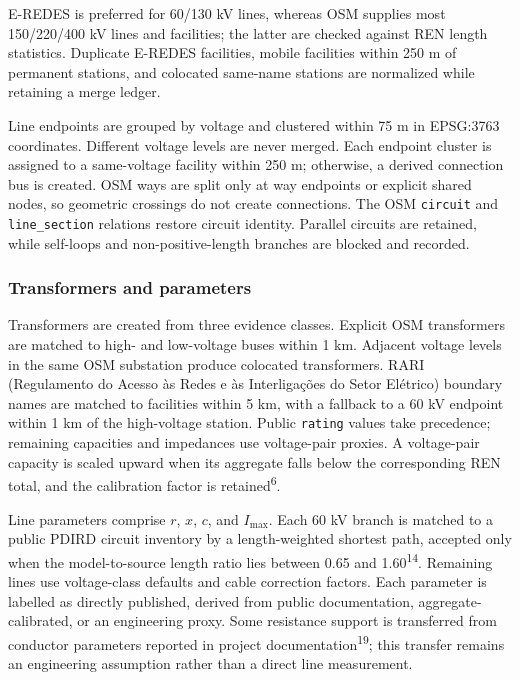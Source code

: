 \documentclass[
  10pt]{article}
\begin{document}
E-REDES is preferred for 60/130 kV lines, whereas OSM supplies most
150/220/400 kV lines and facilities; the latter are checked against REN
length statistics. Duplicate E-REDES facilities, mobile facilities
within 250 m of permanent stations, and colocated same-name stations are
normalized while retaining a merge ledger.

Line endpoints are grouped by voltage and clustered within 75 m in
EPSG:3763 coordinates. Different voltage levels are never merged. Each
endpoint cluster is assigned to a same-voltage facility within 250 m;
otherwise, a derived connection bus is created. OSM ways are split only
at way endpoints or explicit shared nodes, so geometric crossings do not
create connections. The OSM \texttt{circuit} and \texttt{line\_section}
relations restore circuit identity. Parallel circuits are retained,
while self-loops and non-positive-length branches are blocked and
recorded.

\subsubsection{Transformers and
parameters}\label{transformers-and-parameters}

Transformers are created from three evidence classes. Explicit OSM
transformers are matched to high- and low-voltage buses within 1 km.
Adjacent voltage levels in the same OSM substation produce colocated
transformers. RARI (Regulamento do Acesso às Redes e às Interligações do
Setor Elétrico) boundary names are matched to facilities within 5 km,
with a fallback to a 60 kV endpoint within 1 km of the high-voltage
station. Public \texttt{rating} values take precedence; remaining
capacities and impedances use voltage-pair proxies. A voltage-pair
capacity is scaled upward when its aggregate falls below the
corresponding REN total, and the calibration factor is
retained\textsuperscript{6}.

Line parameters comprise \(r\), \(x\), \(c\), and \(I_{\max}\). Each 60
kV branch is matched to a public PDIRD circuit inventory by a
length-weighted shortest path, accepted only when the model-to-source
length ratio lies between 0.65 and 1.60\textsuperscript{14}. Remaining
lines use voltage-class defaults and cable correction factors. Each
parameter is labelled as directly published, derived from public
documentation, aggregate-calibrated, or an engineering proxy. Some
resistance support is transferred from conductor parameters reported in
project documentation\textsuperscript{19}; this transfer remains an
engineering assumption rather than a direct line measurement.
\end{document}
